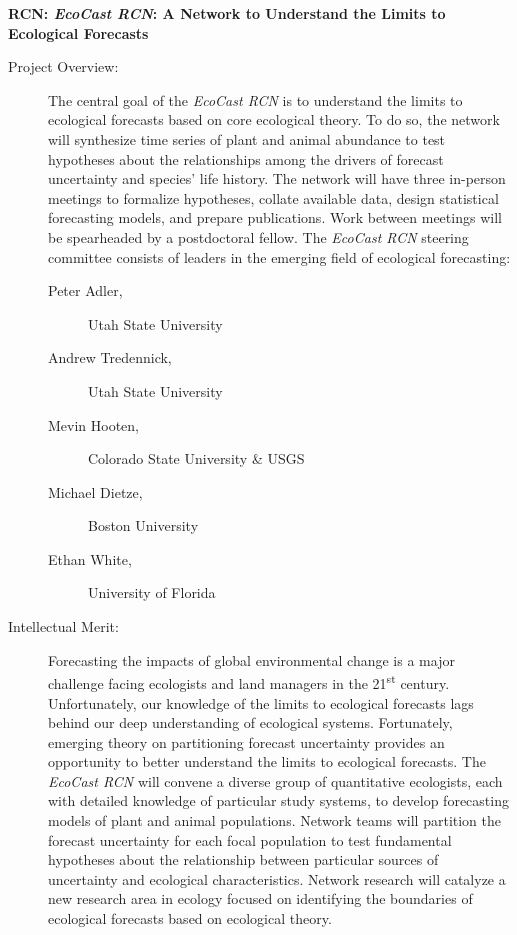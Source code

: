 \documentclass[12pt,]{article}
\title{}
\author{}
\date{}
\begin{document}

\begin{centering}

\textbf{RCN: \emph{EcoCast RCN}: A Network to Understand the Limits to Ecological Forecasts}

\end{centering}

\vspace{2em}

\begin{description}
\item[Project Overview:] The central goal of the \emph{EcoCast RCN} is to understand the limits to ecological forecasts based on core ecological theory. To do so, the network will synthesize time series of plant and animal abundance to test hypotheses about the relationships among the drivers of forecast uncertainty and species' life history. The network will have three in-person meetings to formalize hypotheses, collate available data, design statistical forecasting models, and prepare publications. Work between meetings will be spearheaded by a postdoctoral fellow. The \emph{EcoCast RCN} steering committee consists of leaders in the emerging field of ecological forecasting:
\begin{description}
\item[Peter Adler,] Utah State University \vspace{-0.5em}
\item[Andrew Tredennick,] Utah State University \vspace{-0.5em}
\item[Mevin Hooten,] Colorado State University \& USGS \vspace{-0.5em}
\item[Michael Dietze,] Boston University \vspace{-0.5em}
\item[Ethan White,] University of Florida
\end{description}
\item[Intellectual Merit:] Forecasting the impacts of global environmental change is a major challenge facing ecologists and land managers in the 21\textsuperscript{st} century. Unfortunately, our knowledge of the limits to ecological forecasts lags behind our deep understanding of ecological systems. Fortunately, emerging theory on partitioning forecast uncertainty provides an opportunity to better understand the limits to ecological forecasts. The \emph{EcoCast RCN} will convene a diverse group of quantitative ecologists, each with detailed knowledge of particular study systems, to develop forecasting models of plant and animal populations. Network teams will partition the forecast uncertainty for each focal population to test fundamental hypotheses about the relationship between particular sources of uncertainty and ecological characteristics. Network research will catalyze a new research area in ecology focused on identifying the boundaries of ecological forecasts based on ecological theory. 

\end{description}
\end{document}
